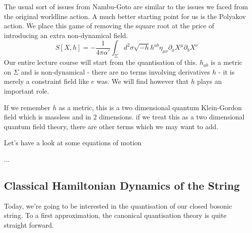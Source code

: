 \documentclass[11pt, oneside]{article}   	%
\theoremstyle{slanted}
\begin{document}
The usual sort of issues from Nambu-Goto 
are similar to the issues we faced from 
the original worldline action. 
A much better starting point 
for us is the Polyakov action. 
We place this game of removing the 
square root at the price of introducing an 
extra non-dynamical field. 
\[
S\left[  X, h   \right] =  - \frac{1}{ 4 \pi \alpha ' } 
\int _{ \Sigma } d ^ 2 \sigma \sqrt{  -h }  h ^{ ab } \eta _{ \mu \nu } 
\partial  _ a X ^ \mu \partial  _ b X ^ \nu 
\]  Our entire lecture course 
will start from the 
quantisation of this. 
$ h _{ ab } $ is a metric on  $ \Sigma $ and is 
non-dynamical  - there are no terms 
involving derivatives $ h$ - it is 
merely a constraint field like $ e $ was. 
We will find however that $ h $ plays 
an important role. 

If we remember $ h $ as a metric, 
this is a two dimensional quantum Klein-Gordon 
field which is massless and in $ 2 $ dimensions. 
if we treat this as a two dimensional quantum field theory, 
there are other terms which we may want to add. 

Let's have a look at 
some equations of motion 

...

\subsection{Classical Hamiltonian Dynamics of the String}
Today, we're 
going to be interested in the quantisation 
of our closed bosonic string. 
To a first approximation, 
the canonical quantisation theory is 
quite straight forward. 
\end{document}
